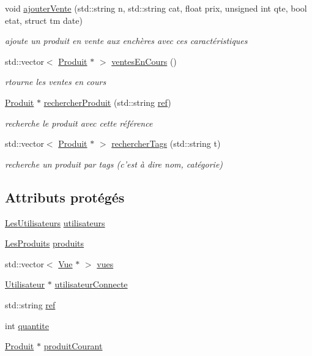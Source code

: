 \begin{DoxyCompactItemize}
void \hyperlink{class_gestion_bdd_af4e95573213751d5487464ff3e24cc98}{ajouter\-Vente} (std\-::string n, std\-::string cat, float prix, unsigned int qte, bool etat, struct tm date)
\begin{DoxyCompactList}\small\item\em ajoute un produit en vente aux enchères avec ces caractéristiques \end{DoxyCompactList}\item 
std\-::vector$<$ \hyperlink{class_produit}{Produit} $\ast$ $>$ \hyperlink{class_gestion_bdd_aa52e1f2d076c4e3f65162e9f28ed20fa}{ventes\-En\-Cours} ()
\begin{DoxyCompactList}\small\item\em rtourne les ventes en cours \end{DoxyCompactList}\item 
\hyperlink{class_produit}{Produit} $\ast$ \hyperlink{class_gestion_bdd_abf0ffd54c39d6dfe431fc8d556eb5c8d}{rechercher\-Produit} (std\-::string \hyperlink{class_gestion_bdd_ae9e26a2043f3e10fb773107809bfc007}{ref})
\begin{DoxyCompactList}\small\item\em recherche le produit avec cette référence \end{DoxyCompactList}\item 
std\-::vector$<$ \hyperlink{class_produit}{Produit} $\ast$ $>$ \hyperlink{class_gestion_bdd_aadc12bc0c3aee41bc56918e44b5d1085}{rechercher\-Tags} (std\-::string t)
\begin{DoxyCompactList}\small\item\em recherche un produit par tags (c'est à dire nom, catégorie) \end{DoxyCompactList}\end{DoxyCompactItemize}
\subsection*{Attributs protégés}
\begin{DoxyCompactItemize}
\item 
\hyperlink{class_les_utilisateurs}{Les\-Utilisateurs} \hyperlink{class_gestion_bdd_a43b0bcad5d1eb6ff51c78ceb6cdd972c}{utilisateurs}
\item 
\hyperlink{class_les_produits}{Les\-Produits} \hyperlink{class_gestion_bdd_a3d8399948251d113edf841e5122c51b8}{produits}
\item 
std\-::vector$<$ \hyperlink{class_vue}{Vue} $\ast$ $>$ \hyperlink{class_gestion_bdd_a44ea1efd29c4996b1dcba0bf428051a7}{vues}
\item 
\hyperlink{class_utilisateur}{Utilisateur} $\ast$ \hyperlink{class_gestion_bdd_adb07bb1f3015855aef7bcfe0b278ebd7}{utilisateur\-Connecte}
\item 
std\-::string \hyperlink{class_gestion_bdd_ae9e26a2043f3e10fb773107809bfc007}{ref}
\item 
int \hyperlink{class_gestion_bdd_aea2dfb9c9690c8aef62feb9936426588}{quantite}
\item 
\hyperlink{class_produit}{Produit} $\ast$ \hyperlink{class_gestion_bdd_a892f50933d1226a389b561276bd0ca93}{produit\-Courant}
\end{DoxyCompactItemize}


